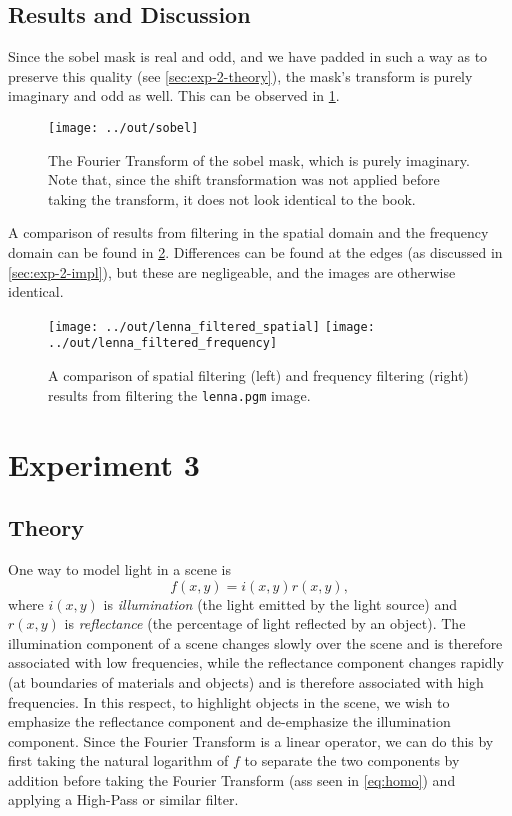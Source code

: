 \documentclass[headings=optiontoheadandtoc,listof=totoc,parskip=full]{scrartcl}
\begin{document}
\subsection{Results and Discussion}
Since the sobel mask is real and odd, and we have padded in such a way as to preserve this quality (see \cref{sec:exp-2-theory}), the mask's transform is purely imaginary and odd as well. This can be observed in \cref{fig:sobel}.

\begin{figure}[H]
	\centering
	\texttt{[image: ../out/sobel]}
	\caption{The Fourier Transform of the sobel mask, which is purely imaginary. Note that, since the shift transformation was not applied before taking the transform, it does not look identical to the book.}
	\label{fig:sobel}
\end{figure}

A comparison of results from filtering in the spatial domain and the frequency domain can be found in \cref{fig:filter-comparison}. Differences can be found at the edges (as discussed in \cref{sec:exp-2-impl}), but these are negligeable, and the images are otherwise identical.

\begin{figure}[H]
	\centering
	\texttt{[image: ../out/lenna\_filtered\_spatial]}
	\quad
	\texttt{[image: ../out/lenna\_filtered\_frequency]}
	\caption{A comparison of spatial filtering (left) and frequency filtering (right) results from filtering the \texttt{lenna.pgm} image.}
	\label{fig:filter-comparison}
\end{figure}

\section{Experiment 3}
\label{sec:exp-3}

\subsection{Theory}
\label{sec:exp-3-theory}
One way to model light in a scene is
\[
	f(x,y) = i(x,y)r(x,y),
\]
where $i(x,y)$ is \emph{illumination} (the light emitted by the light source) and $r(x,y)$ is \emph{reflectance} (the percentage of light reflected by an object). The illumination component of a scene changes slowly over the scene and is therefore associated with low frequencies, while the reflectance component changes rapidly (at boundaries of materials and objects) and is therefore associated with high frequencies. In this respect, to highlight objects in the scene, we wish to emphasize the reflectance component and de-emphasize the illumination component. Since the Fourier Transform is a linear operator, we can do this by first taking the natural logarithm of $f$ to separate the two components by addition before taking the Fourier Transform (ass seen in \cref{eq:homo}) and applying a High-Pass or similar filter. 
\end{document}
